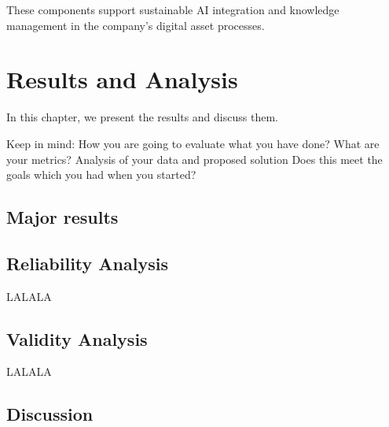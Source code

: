 \documentclass[a4paper,10pt,twocolumn]{article}
\numberwithin{figure}{section}
\numberwithin{table}{section}
\begin{document}
These components support sustainable AI integration and knowledge management in the company’s digital asset processes.


\section{Results and Analysis}
In this chapter, we present the results and discuss them.

Keep in mind: How you are going to evaluate what you have done? What are your metrics?
Analysis of your data and proposed solution
Does this meet the goals which you had when you started?

\subsection{Major results}



\subsection{Reliability Analysis}
LALALA

\subsection{Validity Analysis}
LALALA


\subsection{Discussion}
\end{document}
